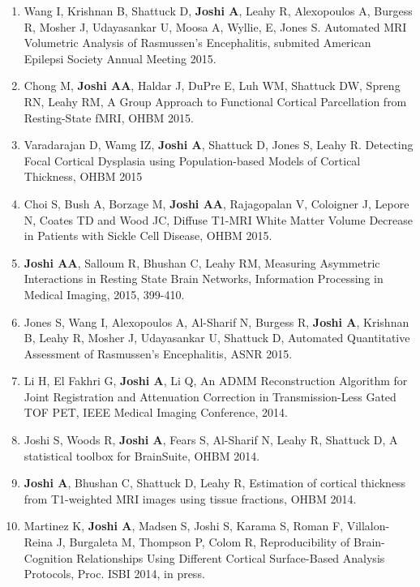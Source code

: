 \documentclass[overlapped,line,letterpaper]{res}
\begin{document}
\begin{resume}
\begin{enumerate}
    \item Wang I, Krishnan B, Shattuck D, \textbf{Joshi A}, Leahy R, Alexopoulos A, Burgess R, Mosher J, Udayasankar U, Moosa A, Wyllie, E, Jones S. {Automated MRI Volumetric Analysis of Rasmussen's Encephalitis}, submited American Epilepsi Society Annual Meeting 2015.

    \item Chong M, \textbf{Joshi AA}, Haldar J, DuPre E, Luh WM, Shattuck DW, Spreng RN, Leahy RM, {A Group Approach to Functional Cortical Parcellation from Resting-State fMRI}, OHBM 2015.

    \item Varadarajan D, Wamg IZ, \textbf{Joshi A}, Shattuck D, Jones S, Leahy R. {Detecting Focal Cortical Dysplasia using Population-based Models of Cortical Thickness},  OHBM 2015

    \item Choi S, Bush A, Borzage M, \textbf{Joshi AA}, Rajagopalan V, Coloigner J, Lepore N, Coates TD and Wood JC, {Diffuse T1-MRI White Matter Volume Decrease in Patients with Sickle Cell Disease}, OHBM 2015.


    \item \textbf{Joshi AA}, Salloum R, Bhushan C, Leahy RM, {Measuring Asymmetric Interactions in Resting State Brain Networks, Information Processing in Medical Imaging}, 2015, 399-410.

    \item Jones S, Wang I, Alexopoulos A, Al-Sharif N, Burgess R, \textbf{Joshi A}, Krishnan B, Leahy R, Mosher J, Udayasankar U, Shattuck D, {Automated Quantitative Assessment of Rasmussen's Encephalitis}, ASNR 2015.

    \item Li H, El Fakhri G, \textbf{Joshi A}, Li Q, {An ADMM Reconstruction Algorithm for Joint Registration and Attenuation Correction in Transmission-Less Gated TOF PET}, IEEE Medical Imaging Conference, 2014.


    \item Joshi S, Woods R, \textbf{Joshi A}, Fears S, Al-Sharif N, Leahy R, Shattuck D, {A statistical toolbox for BrainSuite}, OHBM 2014.

    \item \textbf{Joshi A}, Bhushan C, Shattuck D, Leahy R, {Estimation of cortical thickness from T1-weighted MRI images using tissue fractions}, OHBM 2014.

    \item Martinez K, \textbf{Joshi A}, Madsen S, Joshi S, Karama S, Roman F, Villalon-Reina J, Burgaleta M, Thompson P, Colom R, {Reproducibility of Brain-Cognition Relationships Using Different Cortical Surface-Based Analysis Protocols}, Proc. ISBI 2014, in press.


\end{enumerate}
\end{resume}
\end{document}
